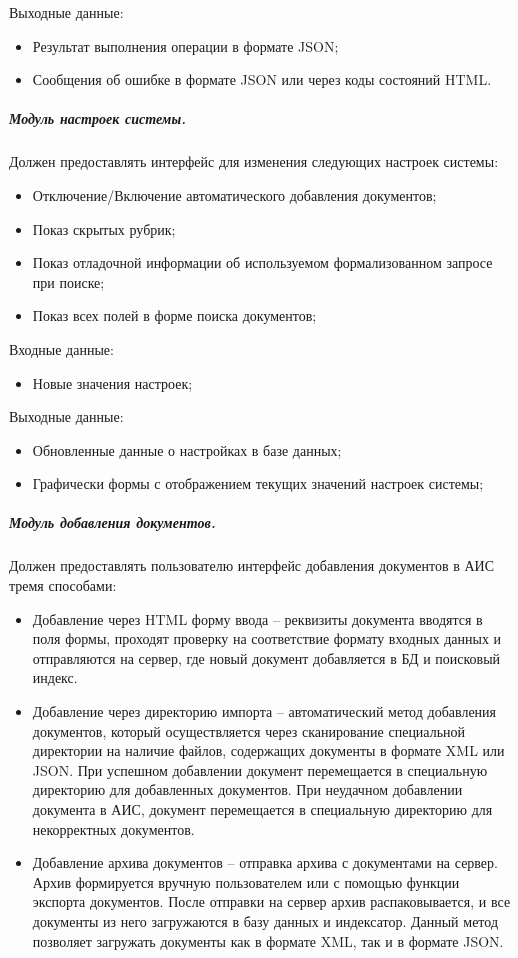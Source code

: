 Выходные данные:
\begin{itemize}
\item Результат выполнения операции в формате JSON;
\item Сообщения об ошибке в формате JSON или через коды состояний HTML.
\end{itemize}

\subparagraph{Модуль настроек системы.} \hfill

Должен предоставлять интерфейс для изменения следующих настроек системы:
\begin{itemize}
\item Отключение/Включение автоматического добавления документов;
\item Показ скрытых рубрик;
\item Показ отладочной информации об используемом формализованном запросе при поиске;
\item Показ всех полей в форме поиска документов;
\end{itemize}

Входные данные:
\begin{itemize}
\item Новые значения настроек;
\end{itemize}

Выходные данные:
\begin{itemize}
\item Обновленные данные о настройках в базе данных;
\item Графически формы с отображением текущих значений настроек системы;
\end{itemize}

\subparagraph{Модуль добавления документов.} \hfill

Должен предоставлять пользователю интерфейс добавления документов в АИС тремя способами:
\begin{itemize}
\item Добавление через HTML форму ввода -- реквизиты документа вводятся в поля формы, проходят проверку на соответствие формату входных данных и отправляются на сервер, где новый документ добавляется в БД и поисковый индекс.
\item Добавление через директорию импорта -- автоматический метод добавления документов, который осуществляется через сканирование специальной директории на наличие файлов, содержащих документы в формате XML или JSON. При успешном добавлении документ перемещается в специальную директорию для добавленных документов. При неудачном добавлении документа в АИС, документ перемещается в специальную директорию для некорректных документов.
\item Добавление архива документов -- отправка архива с документами на сервер. Архив формируется вручную пользователем или с помощью функции экспорта документов. После отправки на сервер архив распаковывается, и все документы из него загружаются в базу данных и индексатор. Данный метод позволяет загружать документы как в формате XML, так и в формате JSON.
\end{itemize}

